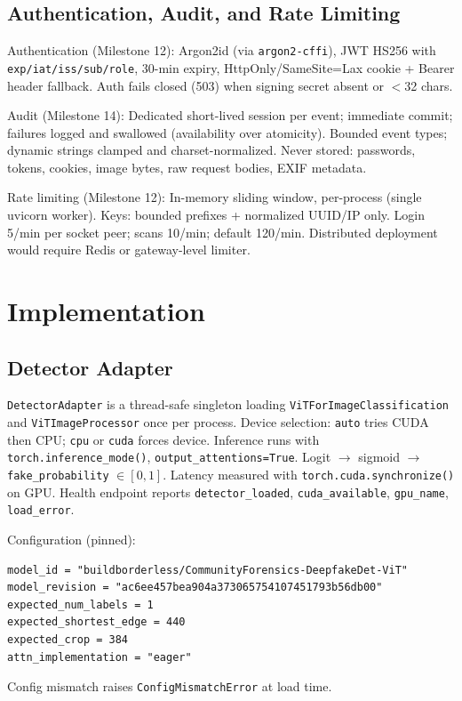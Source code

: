 \documentclass[10pt,conference,compsoc]{IEEEtran}
\begin{document}
\subsection{Authentication, Audit, and Rate Limiting}
\label{sec:auth-audit}

Authentication (Milestone 12): Argon2id (via \texttt{argon2-cffi}), JWT HS256 with \texttt{exp/iat/iss/sub/role}, 30-min expiry, HttpOnly/SameSite=Lax cookie + Bearer header fallback. Auth fails closed (503) when signing secret absent or $<$32 chars.

Audit (Milestone 14): Dedicated short-lived session per event; immediate commit; failures logged and swallowed (availability over atomicity). Bounded event types; dynamic strings clamped and charset-normalized. Never stored: passwords, tokens, cookies, image bytes, raw request bodies, EXIF metadata.

Rate limiting (Milestone 12): In-memory sliding window, per-process (single uvicorn worker). Keys: bounded prefixes + normalized UUID/IP only. Login 5/min per socket peer; scans 10/min; default 120/min. Distributed deployment would require Redis or gateway-level limiter.

\section{Implementation}
\label{sec:implementation}

\subsection{Detector Adapter}
\label{sec:detector-impl}

\texttt{DetectorAdapter} is a thread-safe singleton loading \texttt{ViTForImageClassification} and \texttt{ViTImageProcessor} once per process.
Device selection: \texttt{auto} tries CUDA then CPU; \texttt{cpu} or \texttt{cuda} forces device.
Inference runs with \texttt{torch.inference\_mode()}, \texttt{output\_attentions=True}.
Logit $\to$ sigmoid $\to$ \texttt{fake\_probability} $\in [0,1]$.
Latency measured with \texttt{torch.cuda.synchronize()} on GPU.
Health endpoint reports \texttt{detector\_loaded}, \texttt{cuda\_available}, \texttt{gpu\_name}, \texttt{load\_error}.

Configuration (pinned):
\begin{verbatim}
model_id = "buildborderless/CommunityForensics-DeepfakeDet-ViT"
model_revision = "ac6ee457bea904a373065754107451793b56db00"
expected_num_labels = 1
expected_shortest_edge = 440
expected_crop = 384
attn_implementation = "eager"
\end{verbatim}
Config mismatch raises \texttt{ConfigMismatchError} at load time.
\end{document}
